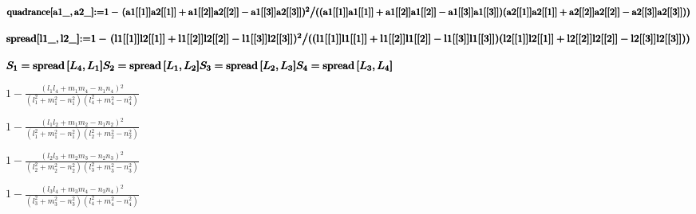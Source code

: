 \documentclass{article}
\begin{document}
\begin{doublespace}
\noindent\(\pmb{\text{quadrance}[\text{a1$\_$},\text{a2$\_$}]\text{:=} }\\
\pmb{1 - \left.(\text{a1}[[1]]\text{a2}[[1]]+\text{a1}[[2]]\text{a2}[[2]]-\text{a1}[[3]]\text{a2}[[3]])^2\right/}\\
\pmb{((\text{a1}[[1]]\text{a1}[[1]]+\text{a1}[[2]]\text{a1}[[2]]-\text{a1}[[3]]\text{a1}[[3]])(\text{a2}[[1]]\text{a2}[[1]]+\text{a2}[[2]]\text{a2}[[2]]-\text{a2}[[3]]\text{a2}[[3]]))}\)
\end{doublespace}

\begin{doublespace}
\noindent\(\pmb{\text{spread}[\text{l1$\_$},\text{l2$\_$}]\text{:=} }\\
\pmb{1 - \left.(\text{l1}[[1]]\text{l2}[[1]]+\text{l1}[[2]]\text{l2}[[2]]-\text{l1}[[3]]\text{l2}[[3]])^2\right/}\\
\pmb{((\text{l1}[[1]]\text{l1}[[1]]+\text{l1}[[2]]\text{l1}[[2]]-\text{l1}[[3]]\text{l1}[[3]])(\text{l2}[[1]]\text{l2}[[1]]+\text{l2}[[2]]\text{l2}[[2]]-\text{l2}[[3]]\text{l2}[[3]]))}\)
\end{doublespace}

\begin{doublespace}
\noindent\(\pmb{S_1=\text{spread}\left[L_4,L_1\right]}\\
\pmb{S_2=\text{spread}\left[L_1,L_2\right]}\\
\pmb{S_3=\text{spread}\left[L_2,L_3\right]}\\
\pmb{S_4=\text{spread}\left[L_3,L_4\right]}\)
\end{doublespace}

\begin{doublespace}
\noindent\(1-\frac{\left(l_1 l_4+m_1 m_4-n_1 n_4\right){}^2}{\left(l_1^2+m_1^2-n_1^2\right) \left(l_4^2+m_4^2-n_4^2\right)}\)
\end{doublespace}

\begin{doublespace}
\noindent\(1-\frac{\left(l_1 l_2+m_1 m_2-n_1 n_2\right){}^2}{\left(l_1^2+m_1^2-n_1^2\right) \left(l_2^2+m_2^2-n_2^2\right)}\)
\end{doublespace}

\begin{doublespace}
\noindent\(1-\frac{\left(l_2 l_3+m_2 m_3-n_2 n_3\right){}^2}{\left(l_2^2+m_2^2-n_2^2\right) \left(l_3^2+m_3^2-n_3^2\right)}\)
\end{doublespace}

\begin{doublespace}
\noindent\(1-\frac{\left(l_3 l_4+m_3 m_4-n_3 n_4\right){}^2}{\left(l_3^2+m_3^2-n_3^2\right) \left(l_4^2+m_4^2-n_4^2\right)}\)
\end{doublespace}
\end{document}
